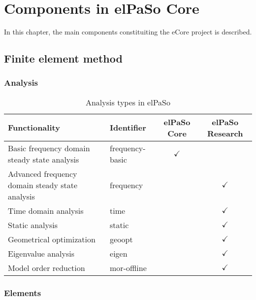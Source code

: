 \chapter{Components in elPaSo Core}
\label{chap:eCoreComponents}

In this chapter, the main components constituiting the eCore project is described.

\section{Finite element method}
\subsection{Analysis}
\begin{table}[h!]
    \centering
    \caption{Analysis types in elPaSo}
    \begin{tabular}{llcc}
        \hline
        Functionality                                   & Identifier      & elPaSo Core  & elPaSo Research \\ \hline
        Basic frequency domain steady state analysis    & frequency-basic & $\checkmark$ &                 \\
        Advanced frequency domain steady state analysis & frequency       &              & $\checkmark$    \\
        Time domain analysis                            & time            &              & $\checkmark$    \\
        Static analysis                                 & static          &              & $\checkmark$    \\
        Geometrical optimization                        & geoopt          &              & $\checkmark$    \\
        Eigenvalue analysis                             & eigen           &              & $\checkmark$    \\
        Model order reduction                           & mor-offline     &              & $\checkmark$    \\ \hline
    \end{tabular}
\end{table}

\subsection{Elements}

